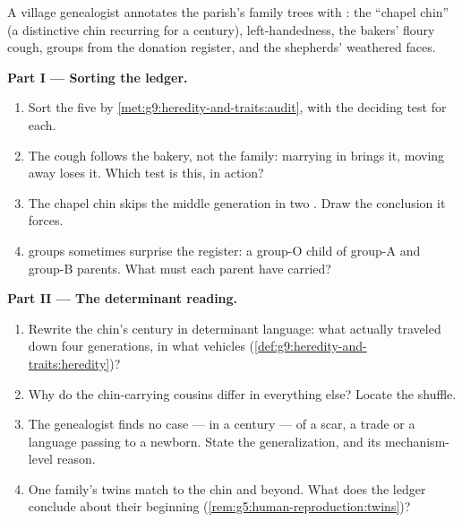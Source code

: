 \begin{problem}\label{pb:g9:heredity-and-traits:1}
A village genealogist annotates the parish's family
trees with : the ``chapel chin'' (a distinctive
chin recurring for a century), left-handedness, the
bakers' floury  cough,  groups from the
donation register, and the shepherds' weathered faces.

\medskip\noindent\textbf{Part I --- Sorting the
ledger.}
\begin{enumerate}
  \item Sort the five  by
        \cref{met:g9:heredity-and-traits:audit}, with
        the deciding test for each.
  \item The cough follows the bakery, not the family:
        marrying in brings it, moving away loses it.
        Which test is this, in action?
  \item The chapel chin skips the middle generation in
        two . Draw the conclusion it forces.
  \item {} groups sometimes surprise the register: a
        group-O child of group-A and group-B parents.
        What must each parent have carried?
\end{enumerate}

\medskip\noindent\textbf{Part II --- The determinant
reading.}
\begin{enumerate}[resume]
  \item Rewrite the chin's century in determinant
        language: what actually traveled down four
        generations, in what vehicles
        (\cref{def:g9:heredity-and-traits:heredity})?
  \item Why do the chin-carrying cousins differ in
        everything else? Locate the shuffle.
  \item The genealogist finds no case --- in a century
        --- of a scar, a trade or a language passing to
        a newborn. State the generalization, and its
        mechanism-level reason.
  \item One family's twins match to the chin and beyond.
        What does the ledger conclude about their
        beginning
        (\cref{rem:g5:human-reproduction:twins})?
\end{enumerate}


\end{problem}

